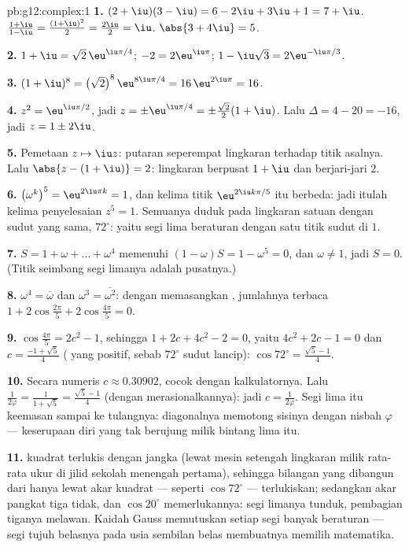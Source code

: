 \begin{solution}{pb:g12:complex:1}
\textbf{1.} $(2 + \iu)(3 - \iu) = 6 - 2\iu + 3\iu + 1 =
7 + \iu$. \quad $\frac{1 + \iu}{1 - \iu} =
\frac{(1 + \iu)^2}{2} = \frac{2\iu}{2} = \iu$. \quad
$\abs{3 + 4\iu} = 5$.

\textbf{2.} $1 + \iu = \sqrt2\,\eu^{\iu\pi/4}$;
$-2 = 2\eu^{\iu\pi}$;
$1 - \iu\sqrt3 = 2\eu^{-\iu\pi/3}$.

\textbf{3.} $(1 + \iu)^8 = \left(\sqrt2\right)^8
\eu^{8\iu\pi/4} = 16\,\eu^{2\iu\pi} = 16$.

\textbf{4.} $z^2 = \eu^{\iu\pi/2}$, jadi
$z = \pm\eu^{\iu\pi/4} = \pm\frac{\sqrt2}{2}(1 + \iu)$. Lalu
$\Delta = 4 - 20 = -16$, jadi $z = 1 \pm 2\iu$.

\textbf{5.} Pemetaan $z \mapsto \iu z$: putaran seperempat lingkaran
terhadap titik asalnya. Lalu $\abs{z - (1 + \iu)} = 2$: lingkaran
berpusat $1 + \iu$ dan berjari-jari $2$.

\textbf{6.} $\left(\omega^k\right)^5 = \eu^{2\iu\pi k} = 1$,
dan kelima titik $\eu^{2\iu k\pi/5}$ itu berbeda: jadi itulah kelima
penyelesaian $z^5 = 1$. Semuanya duduk pada lingkaran satuan dengan
sudut yang sama, $72^\circ$: yaitu segi lima beraturan dengan satu titik sudut di
$1$.

\textbf{7.} $S = 1 + \omega + \dots + \omega^4$ memenuhi
$(1 - \omega)S = 1 - \omega^5 = 0$, dan $\omega \neq 1$, jadi
$S = 0$. (Titik seimbang segi limanya adalah pusatnya.)

\textbf{8.} $\omega^4 = \overline\omega$ dan
$\omega^3 = \overline{\omega^2}$: dengan memasangkan ,  jumlahnya terbaca
$1 + 2\cos\frac{2\pi}{5} + 2\cos\frac{4\pi}{5} = 0$.

\textbf{9.} $\cos\frac{4\pi}{5} = 2c^2 - 1$, sehingga
$1 + 2c + 4c^2 - 2 = 0$, yaitu $4c^2 + 2c - 1 = 0$ dan
$c = \frac{-1 + \sqrt5}{4}$ ( yang positif, sebab
$72^\circ$ sudut lancip):
$\cos 72^\circ = \frac{\sqrt5 - 1}{4}$.

\textbf{10.} Secara numeris $c \approx 0.30902$, cocok dengan
kalkulatornya. Lalu $\frac{1}{2\varphi} = \frac{1}{1 + \sqrt5} =
\frac{\sqrt5 - 1}{4}$ (dengan merasionalkannya): jadi $c = \frac{1}{2\varphi}$.
Segi lima itu keemasan sampai ke tulangnya: diagonalnya memotong
sisinya dengan nisbah $\varphi$ --- keserupaan diri yang tak berujung milik
bintang lima itu.

\textbf{11.}  kuadrat terlukis dengan jangka (lewat mesin
setengah lingkaran milik rata-rata ukur di jilid sekolah menengah
pertama), sehingga bilangan yang dibangun dari  hanya
lewat akar kuadrat --- seperti $\cos 72^\circ$ --- terlukiskan; sedangkan akar
pangkat tiga tidak, dan $\cos 20^\circ$ memerlukannya: segi limanya tunduk,
pembagian tiganya melawan. Kaidah Gauss memutuskan setiap segi banyak
beraturan --- segi tujuh belasnya pada usia sembilan belas membuatnya memilih
matematika.


\end{solution}

